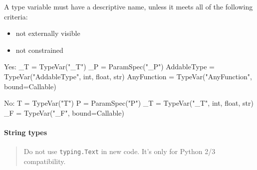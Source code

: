 \documentclass[
]{article}
\newenvironment{Shaded}{}{}
\newcommand{\BuiltInTok}[1]{\textcolor[rgb]{0.00,0.50,0.00}{#1}}
\newcommand{\NormalTok}[1]{#1}
\newcommand{\OperatorTok}[1]{\textcolor[rgb]{0.40,0.40,0.40}{#1}}
\newcommand{\StringTok}[1]{\textcolor[rgb]{0.25,0.44,0.63}{#1}}
\providecommand{\tightlist}{%
  \setlength{\itemsep}{0pt}\setlength{\parskip}{0pt}}
\begin{document}
A type variable must have a descriptive name, unless it meets all of the
following criteria:

\begin{itemize}
\tightlist
\item
  not externally visible
\item
  not constrained
\end{itemize}

\begin{samepage}
\begin{Shaded}
\begin{Highlighting}[]
\NormalTok{Yes:}
\NormalTok{  \_T }\OperatorTok{=}\NormalTok{ TypeVar(}\StringTok{"\_T"}\NormalTok{)}
\NormalTok{  \_P }\OperatorTok{=}\NormalTok{ ParamSpec(}\StringTok{"\_P"}\NormalTok{)}
\NormalTok{  AddableType }\OperatorTok{=}\NormalTok{ TypeVar(}\StringTok{"AddableType"}\NormalTok{, }\BuiltInTok{int}\NormalTok{, }\BuiltInTok{float}\NormalTok{, }\BuiltInTok{str}\NormalTok{)}
\NormalTok{  AnyFunction }\OperatorTok{=}\NormalTok{ TypeVar(}\StringTok{"AnyFunction"}\NormalTok{, bound}\OperatorTok{=}\NormalTok{Callable)}
\end{Highlighting}
\end{Shaded}
\end{samepage}

\begin{samepage}
\begin{Shaded}
\begin{Highlighting}[]
\NormalTok{No:}
\NormalTok{  T }\OperatorTok{=}\NormalTok{ TypeVar(}\StringTok{"T"}\NormalTok{)}
\NormalTok{  P }\OperatorTok{=}\NormalTok{ ParamSpec(}\StringTok{"P"}\NormalTok{)}
\NormalTok{  \_T }\OperatorTok{=}\NormalTok{ TypeVar(}\StringTok{"\_T"}\NormalTok{, }\BuiltInTok{int}\NormalTok{, }\BuiltInTok{float}\NormalTok{, }\BuiltInTok{str}\NormalTok{)}
\NormalTok{  \_F }\OperatorTok{=}\NormalTok{ TypeVar(}\StringTok{"\_F"}\NormalTok{, bound}\OperatorTok{=}\NormalTok{Callable)}
\end{Highlighting}
\end{Shaded}
\end{samepage}

\paragraph{String types}

\begin{quote}
Do not use \texttt{typing.Text} in new code. It's only for Python 2/3
compatibility.
\end{quote}
\end{document}
